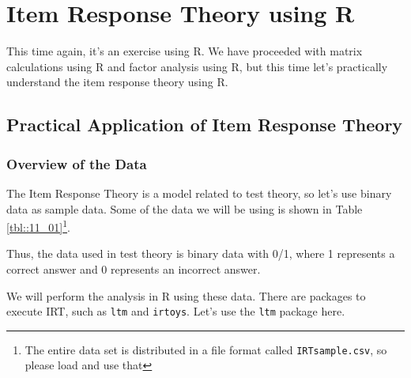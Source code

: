 \documentclass{ltjsbook}
\begin{document}
\chapter{Item Response Theory using R}
\label{x11_IRTonR}

This time again, it's an exercise using R. We have proceeded with matrix calculations using R and factor analysis using R, but this time let's practically understand the item response theory using R.

\section{Practical Application of Item Response Theory}
\subsection{Overview of the Data}
The Item Response Theory is a model related to test theory, so let's use binary data as sample data. Some of the data we will be using is shown in Table \ref{tbl::11_01}\footnote{The entire data set is distributed in a file format called \texttt{IRTsample.csv}, so please load and use that}.


Thus, the data used in test theory is binary data with 0/1, where 1 represents a correct answer and 0 represents an incorrect answer.

We will perform the analysis in R using these data. There are packages to execute IRT, such as \texttt{ltm}\parencite{ltm} and \texttt{irtoys}\parencite{partchev2017package}. Let's use the \texttt{ltm} package here.
\end{document}
